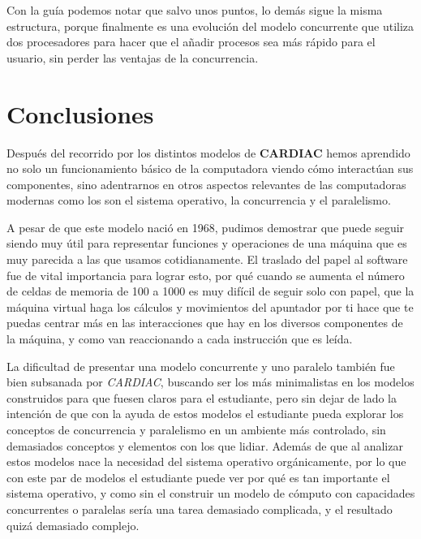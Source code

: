 \documentclass[letterpaper,12pt,oneside]{book}
\begin{document}
			
			Con la guía podemos notar que salvo unos puntos, lo demás sigue la misma estructura, porque finalmente es una evolución
			del modelo concurrente que utiliza dos procesadores para hacer que el añadir procesos sea más rápido para el usuario, sin
			perder las ventajas de la concurrencia.

\chapter{Conclusiones}


			Después del recorrido por los distintos modelos de \textbf{CARDIAC} hemos aprendido no solo un funcionamiento básico de la computadora
			viendo cómo interactúan sus componentes, sino adentrarnos en otros aspectos relevantes de las computadoras modernas como los son
			el sistema operativo, la concurrencia y el paralelismo.
			
			A pesar de que este modelo nació en 1968, pudimos demostrar que puede
			seguir siendo muy útil para representar funciones y operaciones de una máquina que es muy parecida a las que usamos
			cotidianamente. El traslado del papel al software fue de vital importancia para lograr esto, por qué cuando se aumenta
			el número de celdas de memoria de 100 a 1000 es muy difícil de seguir solo con papel, que la máquina virtual haga los
			cálculos y movimientos del apuntador por ti hace que te puedas centrar más en las interacciones que hay en los diversos componentes de la 
			máquina, y como
			van reaccionando a cada instrucción que es leída.
			
			La dificultad de presentar una modelo concurrente y uno paralelo también fue bien subsanada por \textit{CARDIAC}, buscando ser
			los más minimalistas en los modelos construidos para que fuesen claros para el estudiante, pero sin dejar de lado la intención
			de que con la ayuda de estos modelos el estudiante pueda explorar los conceptos de concurrencia y paralelismo en un ambiente
			más controlado, sin demasiados conceptos y elementos con los que lidiar. Además de que al analizar estos modelos
			nace la necesidad del sistema operativo orgánicamente, por lo que con este par de modelos el estudiante puede ver
			por qué es tan importante el sistema operativo, y como sin el construir un modelo de cómputo con capacidades concurrentes o paralelas
			sería una tarea demasiado complicada, y el resultado quizá demasiado complejo.
			
\end{document}
